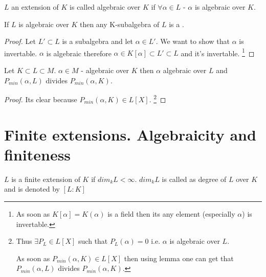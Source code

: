 \begin{definition}
  $L$ an extension of $K$ is called algebraic over $K$ if $\forall
  \alpha \in L$ - $\alpha$ is algebraic over $K$. 
  \label{def:algebraicextension}
\end{definition}

\begin{proposition}
  If $L$ is algebraic over $K$ then any K-subalgebra of $L$ is a
  .
  \begin{proof}
    Let $L' \subset L$ is a subalgebra and let $\alpha \in L'$. We want
    to show that $\alpha$ is invertable. $\alpha$ is algebraic
    therefore $\alpha \in K\left[\alpha\right] \subset L' \subset L$
    and it's invertable.
    \footnote{
      As soon as $K\left[\alpha\right] = K\left(\alpha\right)$ is a
      field then its any element (especially $\alpha$) is invertable. 
    }
  \end{proof}
\end{proposition}

\begin{proposition}
  Let $K \subset L \subset M$. $\alpha \in M$ - algebraic over $K$
  then $\alpha$ algebraic over $L$ and
  $P_{min}\left(\alpha, L\right)$ divides $P_{min}\left(\alpha,
  K\right)$. 
  \begin{proof}
    Its clear because $P_{min}\left(\alpha,K\right) \in
    L\left[X\right]$.
    \footnote{
      Thus $\exists P_L \in L\left[X\right]$ such that
      $P_L\left(\alpha\right) = 0$ i.e. $\alpha$ is algebraic over $L$.
      
      As soon as $P_{min}\left(\alpha,K\right) \in L\left[X\right]$ then
      using lemma  one can get that
      $P_{min}\left(\alpha,L\right)$ divides
      $P_{min}\left(\alpha,K\right)$.
    }
  \end{proof}
\end{proposition}


\section{Finite extensions. Algebraicity and finiteness}

\begin{definition}
  $L$ is a finite extension of $K$ if $dim_k L < \infty$. $dim_k L$ is
  called as degree of $L$ over $K$ and is denoted by
  $\left[L:K\right]$
  \label{def:finiteextension}
\end{definition}

